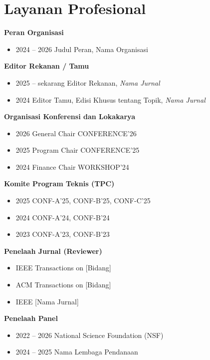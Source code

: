 \section{Layanan Profesional}

\noindent\textbf{Peran Organisasi}
\begin{itemize}
  \item 2024 -- 2026 \quad Judul Peran, Nama Organisasi
\end{itemize}

\noindent\textbf{Editor Rekanan / Tamu}
\begin{itemize}
  \item 2025 -- sekarang \quad Editor Rekanan, \textit{Nama Jurnal}
  \item 2024 \quad Editor Tamu, Edisi Khusus tentang Topik, \textit{Nama Jurnal}
\end{itemize}

\noindent\textbf{Organisasi Konferensi dan Lokakarya}
\begin{itemize}
  \item 2026 \quad General Chair CONFERENCE'26
  \item 2025 \quad Program Chair CONFERENCE'25
  \item 2024 \quad Finance Chair WORKSHOP'24
\end{itemize}

\noindent\textbf{Komite Program Teknis (TPC)}
\begin{itemize}
  \item 2025 \quad CONF-A'25, CONF-B'25, CONF-C'25
  \item 2024 \quad CONF-A'24, CONF-B'24
  \item 2023 \quad CONF-A'23, CONF-B'23
\end{itemize}

\noindent\textbf{Penelaah Jurnal (Reviewer)}
\begin{itemize}
  \item IEEE Transactions on [Bidang]
  \item ACM Transactions on [Bidang]
  \item IEEE [Nama Jurnal]
\end{itemize}

\noindent\textbf{Penelaah Panel}
\begin{itemize}
  \item 2022 -- 2026 \quad National Science Foundation (NSF)
  \item 2024 -- 2025 \quad Nama Lembaga Pendanaan
\end{itemize}
